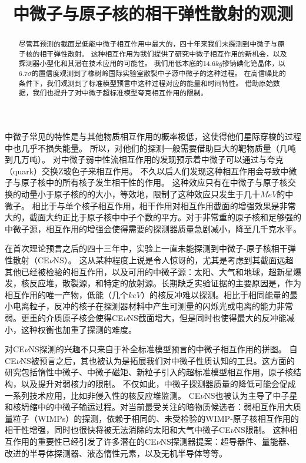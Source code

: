 
\begin{translation}
\label{cha:translation}

\title{中微子与原子核的相干弹性散射的观测}
\maketitle

\tableofcontents

\begin{abstract}
  尽管其预测的截面是低能中微子相互作用中最大的，四十年来我们未探测到中微子与原子核的相干弹性散射。
  这种相互作用为我们提供了研究中微子相互作用的新机会，以及探测器小型化和其潜在技术应用的可能性。
  我们用低本底的14.6$\si{kg}$掺钠碘化铯晶体，以6.7$\sigma$的置信度观测到了橡树岭国际实验室散裂中子源中微子的这种过程。
  在高信噪比的条件下，我们观测到了标准模型预言中这种过程对应的能量和时间特性。
  借助原始数据，我们也提升了对中微子超标准模型夸克相互作用的限制。
\end{abstract}

中微子常见的特性是与其他物质相互作用的概率极低，这使得他们星际穿梭的过程中也几乎不损失能量。
所以，对他们的探测一般需要借助巨大的靶物质量（几吨到几万吨）。
对中微子弱中性流相互作用的发现预示着中微子可以通过与夸克（quark）交换Z玻色子来相互作用。
不久以后人们发现这种相互作用会导致中微子与原子核中的所有核子发生相干性的作用。
这种效应只有在中微子与原子核交换的动量小于原子核的的大小，等效地，限制了这种效应只发生于几十$\si{MeV}$的中微子。
相比于与单个核子相互作用，相干作用对相互作用截面的增强效果是非常大的，截面大约正比于原子核中中子个数的平方。对于非常重的原子核和足够强的中微子源，相互作用的增强会使得需要的探测器质量急剧减小，降至几千克水平。

在首次理论预言之后的四十三年中，实验上一直未能探测到中微子-原子核相干弹性散射（CE$\nu$NS）。
这从某种程度上说是令人惊讶的，尤其是考虑到其截面远超其他已经被检验的相互作用，以及可用的中微子源：太阳、大气和地球，超新星爆发，核反应堆，散裂源，和特定的放射源。长期缺乏实验证据的主要原因是，作为相互作用的唯一产物，低能（几个$\si{keV}$）的核反冲难以探测。相比于相同能量的最小电离粒子，反冲的核子在探测器材料中产生可测量的闪烁光或电离的能力非常弱。更重的介质原子核会使得CE$\nu$NS截面增大，但是同时也使得最大的反冲能减小，这种权衡也加重了探测的难度。

对CE$\nu$NS探测的兴趣不只来自于补全标准模型预言的中微子相互作用的拼图。
自CE$\nu$NS被预言之后，其也被认为是拓展我们对中微子性质认知的工具。这方面的研究包括惰性中微子、中微子磁矩、新粒子引入的超标准模型相互作用，原子核结构，以及提升对弱核力的限制。
不仅如此，中微子探测器质量的降低可能会促成一系列技术应用，比如非侵入性的核反应堆监测。
CE$\nu$NS也被认为主导了中子星和核坍缩中的中微子输运过程。对当前最受关注的暗物质候选者：弱相互作用大质量粒子（WIMPs）的探测，依赖于相同的、未受检验的WIMP-原子核相互作用的相干性增强，同时也很快将被无法消除的太阳和大气中微子CE$\nu$NS限制。
这种相互作用的重要性已经引发了许多潜在的CE$\nu$NS探测器提案：超导器件、量能器、改进的半导体探测器、液态惰性元素，以及无机半导体等等。


\end{translation}

